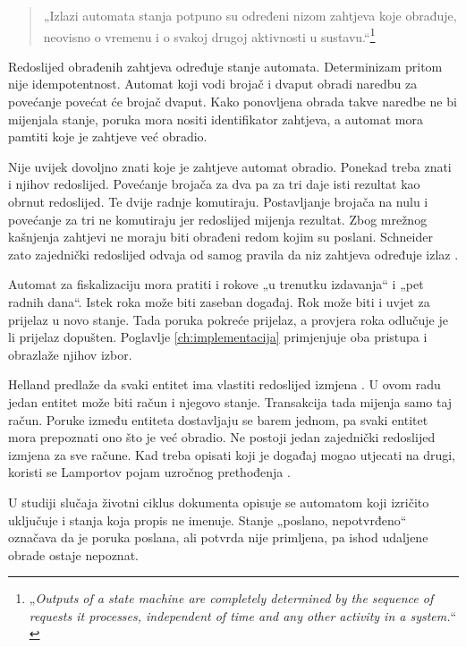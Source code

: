 \begin{quote}
„Izlazi automata stanja potpuno su određeni nizom zahtjeva koje obrađuje,
neovisno o vremenu i o svakoj drugoj aktivnosti u
sustavu.“\footnote{„\emph{Outputs of a state machine are completely
determined by the sequence of requests it processes, independent of time and
any other activity in a system.}“ \cite{schneider1990statemachine}}
\end{quote}

Redoslijed obrađenih zahtjeva određuje stanje automata. Determinizam pritom
nije idempotentnost. Automat koji vodi brojač i dvaput obradi naredbu za
povećanje povećat će brojač dvaput. Kako ponovljena obrada takve naredbe ne bi
mijenjala stanje, poruka mora nositi identifikator zahtjeva, a automat mora
pamtiti koje je zahtjeve već obradio.

Nije uvijek dovoljno znati koje je zahtjeve automat obradio. Ponekad treba
znati i njihov redoslijed. Povećanje brojača za dva pa za tri daje isti
rezultat kao obrnut redoslijed. Te dvije radnje komutiraju. Postavljanje
brojača na nulu i povećanje za tri ne komutiraju jer redoslijed mijenja
rezultat. Zbog mrežnog kašnjenja zahtjevi ne moraju biti obrađeni redom kojim
su poslani. Schneider zato zajednički redoslijed odvaja od samog pravila da
niz zahtjeva određuje izlaz \cite{schneider1990statemachine}.

Automat za fiskalizaciju mora pratiti i rokove „u trenutku izdavanja“ i „pet
radnih dana“. Istek roka može biti zaseban događaj. Rok može biti i uvjet za
prijelaz u novo stanje. Tada poruka pokreće prijelaz, a provjera roka odlučuje
je li prijelaz dopušten. Poglavlje \ref{ch:implementacija} primjenjuje oba
pristupa i obrazlaže njihov izbor.

Helland predlaže da svaki entitet ima vlastiti redoslijed izmjena
\cite{helland2007lifebeyond}. U ovom radu jedan entitet može biti račun i
njegovo stanje. Transakcija tada mijenja samo taj račun. Poruke između
entiteta dostavljaju se barem jednom, pa svaki entitet mora prepoznati ono što
je već obradio. Ne postoji jedan zajednički redoslijed izmjena za sve račune.
Kad treba opisati koji je događaj mogao utjecati na drugi, koristi se
Lamportov pojam uzročnog prethođenja \cite{lamport1978time}.

U studiji slučaja životni ciklus dokumenta opisuje se automatom koji
izričito uključuje i stanja koja propis ne imenuje. Stanje „poslano,
nepotvrđeno“ označava da je poruka poslana, ali potvrda nije primljena, pa
ishod udaljene obrade ostaje nepoznat.
